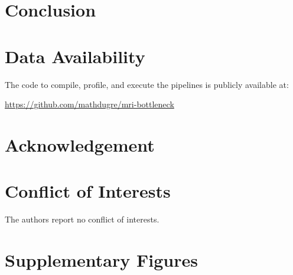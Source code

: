 \documentclass[conference]{IEEEtran}
\begin{document}
\section{Conclusion}

\section{Data Availability}
\label{data-availability}
The code to compile, profile, and execute the pipelines is publicly available at:

\href{https://github.com/mathdugre/mri-bottleneck}{https://github.com/mathdugre/mri-bottleneck}

\section*{Acknowledgement}

\section*{Conflict of Interests}
The authors report no conflict of interests.

\section*{Supplementary Figures}


% 

\end{document}
